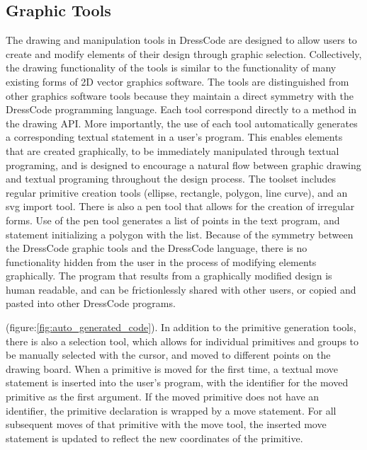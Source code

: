 \documentclass{sigchi}
\begin{document}
\subsection{Graphic Tools}
\label{subsec:graphic_tools_test}
The drawing and manipulation tools in DressCode are designed to allow users to create and modify elements of their design through graphic selection. Collectively, the drawing functionality of the tools is similar to the functionality of many existing forms of  2D vector graphics software. The tools are distinguished from other graphics software tools because they maintain a direct symmetry with the DressCode programming language. Each tool correspond directly to a method in the drawing API. More importantly, the use of each tool automatically generates a corresponding textual statement in a user's program. This enables elements that are created graphically, to be immediately manipulated through textual programing, and is designed to encourage a natural flow between graphic drawing and textual programing throughout the design process. The toolset includes regular primitive creation tools (ellipse, rectangle, polygon, line curve), and an svg import tool. There is also a pen tool that allows for the creation of irregular forms. Use of the pen tool generates a list of points in the text program, and statement initializing a polygon with the list. Because of the symmetry between the DressCode graphic tools and the DressCode language, there is no functionality hidden from the user in the process of modifying elements graphically. The program that results from a graphically modified design is human readable, and can be frictionlessly shared with other users, or copied and pasted into other DressCode programs.

(figure:\ref{fig:auto_generated_code}). In addition to the primitive generation tools, there is also a selection tool, which allows for individual primitives and groups to be manually selected with the cursor, and moved to different points on the drawing board. When a primitive is moved for the first time, a textual move statement is inserted into the user's program, with the identifier for the moved primitive as the first argument. If the moved primitive does not have an identifier, the primitive declaration is wrapped by a move statement. For all subsequent moves of that primitive with the move tool, the inserted move statement is updated to reflect the new coordinates of the primitive. %
\end{document}
